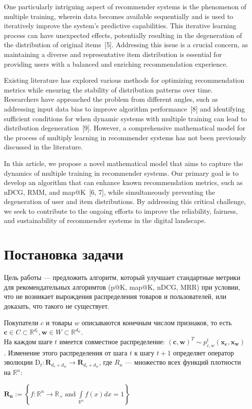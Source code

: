 \documentclass{article}
\begin{document}
One particularly intriguing aspect of recommender systems is the phenomenon of multiple training, wherein data becomes available sequentially and is used to iteratively improve the system's predictive capabilities. This iterative learning process can have unexpected effects, potentially resulting in the degeneration of the distribution of original items~[5]. Addressing this issue is a crucial concern, as maintaining a diverse and representative item distribution is essential for providing users with a balanced and enriching recommendation experience.

Existing literature has explored various methods for optimizing recommendation metrics while ensuring the stability of distribution patterns over time. Researchers have approached the problem from different angles, such as addressing input data bias to improve algorithm performance~[8] and identifying sufficient conditions for when dynamic systems with multiple training can lead to distribution degeneration~[9]. However, a comprehensive mathematical model for the process of multiply learning in recommender systems has not been previously discussed in the literature.

In this article, we propose a novel mathematical model that aims to capture the dynamics of multiple training in recommender systems. Our primary goal is to develop an algorithm that can enhance known recommendation metrics, such as nDCG, RMM, and map@K~[6, 7], while simultaneously preventing the degeneration of user and item distributions. By addressing this critical challenge, we seek to contribute to the ongoing efforts to improve the reliability, fairness, and sustainability of recommender systems in the digital landscape.

\section{Постановка задачи}

Цель работы --- предложить алгоритм, который улучшает стандартные метрики для рекомендательных алгоримтов (p@K, map@K, nDCG, MRR) при условии, что не возникает вырождения распределения товаров и пользователей, или доказать, что такого не существует.

Покупатели $c$ и товары $w$ описываются конечным числом признаков, то есть $ \mathbf{c} \in C \subset \mathbb{R}^{d_c}, \mathbf{w} \in W \subset \mathbb{R}^{d_w}$.\\
На каждом шаге $t$ имеется совместное распределение: $(\mathbf{c}, \mathbf{w})^T \sim p^{t}_{c,w} (\mathbf{x_c} , \mathbf{x_w} )$ . Изменение этого распределения от шага $t$ к шагу $t + 1$ определяет оператор эволюции $\text{D}_t : \textbf{R}_{d_c + d_w} \rightarrow \textbf{R}_{d_c + d_w} $, где $R_n$ --- множество всех функций плотности на $\mathbb{R}^n:$
\begin{center}
$
        \mathbf{R_n} := \left\{f : \mathbb{R}^n \rightarrow \mathbb{R}_+ ~\text{and}~ \int\limits_{\mathbb{R}^n}f(x)dx = 1\right\}
        $
\end{center}
\end{document}
